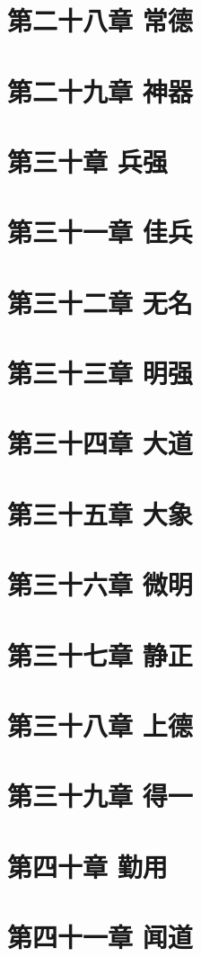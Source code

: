 \documentclass[UTF8]{ctexbook}
\begin{document}
	\section{第二十八章 常德}
	\section{第二十九章 神器}
	\section{第三十章 兵强}
	\section{第三十一章 佳兵}
	\section{第三十二章 无名}
	\section{第三十三章 明强}
	\section{第三十四章 大道}
	\section{第三十五章 大象}
	\section{第三十六章 微明}
	\section{第三十七章 静正}
	\section{第三十八章 上德}
	\section{第三十九章 得一}
	\section{第四十章 勤用}
	\section{第四十一章 闻道}
\end{document}

